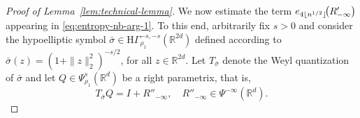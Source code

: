 \documentclass[a4paper,12pt]{article}
\let\originalleft\left
\let\originalright\right
\renewcommand{\left}{\mathopen{}\mathclose\bgroup\originalleft}
\renewcommand{\right}{\aftergroup\egroup\originalright}
\newcommand{\N}{\mathbb{N}}
\newcommand{\R}{\mathbb{R}}
\newcommand{\hyposymbclassinv}{\mathrm{H}\Gamma^{-m_+,-m_-}_\rho}
\newcommand{\symbolnot}{\sigma}
\begin{document}
\begin{proof}[Proof of Lemma~\ref{lem:technical-lemma}]







We now estimate the term
$e_{4\lfloor n^{1/2}\rfloor}\!\left(R'_{-\infty}\right)$
appearing in \eqref{eq:entropy-nb-arg-1}.
To this end, arbitrarily fix $s>0$ and consider the hypoelliptic symbol
$\bar\sigma\in \mathrm{H}\Gamma^{-s,-s}_{\rho_1}(\R^{2d})$
defined according to $\bar\sigma(z) = (1+\|z\|_2^2)^{-s/2}$, for all $z\in\R^{2d}$.
Let $T_{\bar\sigma}$ denote the Weyl quantization of $\bar\sigma$ and let $Q\in\Psi^{s}_{\rho_1}(\R^d)$ be a right parametrix, that is, 
\begin{equation*}
    T_{\bar\sigma} Q = I + R''_{-\infty}, 
    \quad  R''_{-\infty} \in \Psi^{-\infty}(\R^d).
\end{equation*}





\end{proof}
\end{document}
